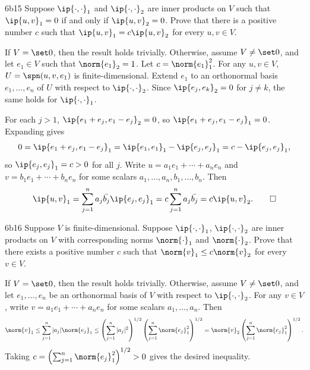 \begin{exercise}{6b15}
    Suppose $\ip{\cdot, \cdot}_1$ and $\ip{\cdot, \cdot}_2$ are inner products on $V$ such that $\ip{u, v}_1 = 0$ if and only if $\ip{u, v}_2 = 0$.
    Prove that there is a positive number $c$ such that $\ip{u, v}_1 = c\ip{u, v}_2$ for every $u, v \in V$.

\end{exercise}

\begin{sol}
    If $V = \set 0$, then the result holds trivially.
    Otherwise, assume $V \neq \set 0$, and let $e_1 \in V$ such that $\norm{e_1}_2 = 1$.
    Let $c = \norm{e_1}_1^2$.
    For any $u, v \in V$, $U = \spn(u, v, e_1)$ is finite-dimensional.
    Extend $e_1$ to an orthonormal basis $e_1, \ldots, e_n$ of $U$ with respect to $\ip{\cdot, \cdot}_2$.
    Since $\ip{e_j, e_k}_2 = 0$ for $j \neq k$, the same holds for $\ip{\cdot, \cdot}_1$.

    For each $j > 1$, $\ip{e_1 + e_j, e_1 - e_j}_2 = 0$, so $\ip{e_1 + e_j, e_1 - e_j}_1 = 0$.
    Expanding gives
    \[
        0 = \ip{e_1 + e_j, e_1 - e_j}_1 = \ip{e_1, e_1}_1 - \ip{e_j, e_j}_1 = c - \ip{e_j, e_j}_1,
    \]
    so $\ip{e_j, e_j}_1 = c > 0$ for all $j$.
    Write $u = a_1 e_1 + \cdots + a_n e_n$ and $v = b_1 e_1 + \cdots + b_n e_n$ for some scalars $a_1, \ldots, a_n, b_1, \ldots, b_n$.
    Then
    \[
        \ip{u, v}_1 = \sum_{j=1}^{n} a_j\bar{b_j}\ip{e_j, e_j}_1 = c\sum_{j=1}^{n} a_j\bar{b_j} = c\ip{u, v}_2. \qedhere
    \]
\end{sol}

\begin{exercise}{6b16}
    Suppose $V$ is finite-dimensional.
    Suppose $\ip{\cdot, \cdot}_1$, $\ip{\cdot, \cdot}_2$ are inner products on $V$ with corresponding norms $\norm{\cdot}_1$ and $\norm{\cdot}_2$.
    Prove that there exists a positive number $c$ such that $\norm{v}_1 \leq c\norm{v}_2$ for every $v \in V$.
\end{exercise}

\begin{sol}
    If $V = \set 0$, then the result holds trivially.
    Otherwise, assume $V \neq \set 0$, and let $e_1, \ldots, e_n$ be an orthonormal basis of $V$ with respect to $\ip{\cdot, \cdot}_2$.
    For any $v \in V$, write $v = a_1 e_1 + \cdots + a_n e_n$ for some scalars $a_1, \ldots, a_n$.
    Then
    \[
        \norm{v}_1 \leq \sum_{j=1}^{n} |a_j|\norm{e_j}_1 \leq \left(\sum_{j=1}^{n} |a_j|^2\right)^{1/2} \left(\sum_{j=1}^{n} \norm{e_j}_1^2\right)^{1/2} = \norm{v}_2 \left(\sum_{j=1}^{n} \norm{e_j}_1^2\right)^{1/2}.
    \]
    Taking $c = \left(\sum_{j=1}^{n} \norm{e_j}_1^2\right)^{1/2} > 0$ gives the desired inequality.
\end{sol}


